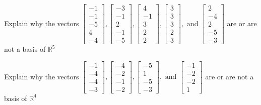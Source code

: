 \documentclass{article}
\begin{document}
\begin{exerciseStatement}
    Explain why the vectors \(\left[\begin{array}{r}
-1 \\
-1 \\
-5 \\
4 \\
-4
\end{array}\right] , \left[\begin{array}{r}
-3 \\
-1 \\
2 \\
-1 \\
-5
\end{array}\right] , \left[\begin{array}{r}
4 \\
-1 \\
3 \\
2 \\
2
\end{array}\right] , \left[\begin{array}{r}
3 \\
3 \\
3 \\
2 \\
3
\end{array}\right] , \text{ and } \left[\begin{array}{r}
2 \\
-4 \\
2 \\
-5 \\
-3
\end{array}\right]\) are or are not a basis of \(\mathbb{R}^5\)


  
\end{exerciseStatement}

\begin{exerciseStatement}
    Explain why the vectors \(\left[\begin{array}{r}
-1 \\
-4 \\
-4 \\
-3
\end{array}\right] , \left[\begin{array}{r}
-4 \\
-2 \\
-1 \\
-2
\end{array}\right] , \left[\begin{array}{r}
-5 \\
1 \\
-5 \\
-3
\end{array}\right] , \text{ and } \left[\begin{array}{r}
-1 \\
-2 \\
-2 \\
1
\end{array}\right]\) are or are not a basis of \(\mathbb{R}^4\)


  
\end{exerciseStatement}
\end{document}

